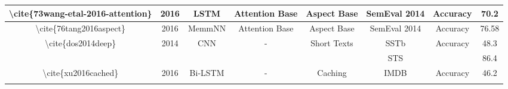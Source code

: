 \begin{table}[]
\begin{tabular}{|c|c|c|c|c|c|cc|}
    \textbackslash{}cite\{73wang-etal-2016-attention\}                                    & 2016                                       & LSTM                                              & Attention Base                                            & Aspect Base                                                                                                            & SemEval 2014                                          & \multicolumn{1}{c|}{Accuracy}                                                                                                      & 70.2                       \\ \hline
    \textbackslash{}cite\{76tang2016aspect\}                                              & 2016                                       & MemmNN                                            & Attention Base                                            & Aspect Base                                                                                                            & SemEval 2014                                          & \multicolumn{1}{c|}{Accuracy}                                                                                                      & 76.58                      \\ \hline
    \multirow{2}{*}{\textbackslash{}cite\{dos2014deep\}}                                  & \multirow{2}{*}{2014}                      & \multirow{2}{*}{CNN}                              & \multirow{2}{*}{-}                                        & \multirow{2}{*}{Short Texts}                                                                                           & SSTb                                                  & \multicolumn{1}{c|}{\multirow{2}{*}{Accuracy}}                                                                                     & 48.3                       \\ \cline{6-6} \cline{8-8} 
                                                                                          &                                            &                                                   &                                                           &                                                                                                                        & STS                                                   & \multicolumn{1}{c|}{}                                                                                                              & 86.4                       \\ \hline
    \multirow{6}{*}{\textbackslash{}cite\{xu2016cached\}}                                 & \multirow{6}{*}{2016}                      & \multirow{6}{*}{Bi-LSTM}                          & \multirow{6}{*}{-}                                        & \multirow{6}{*}{Caching}                                                                                               & \multirow{2}{*}{IMDB}                                 & \multicolumn{1}{c|}{Accuracy}                                                                                                      & 46.2                       \\ \cline{7-8} 

\end{tabular}
\end{table}
